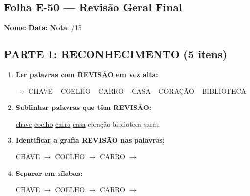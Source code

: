 \subsection{Folha E-50 --- Revisão Geral Final}
\begin{exercicio}



\noindent\textbf{Nome:} \underline{\hspace{3.2cm}} \quad \textbf{Data:} \underline{\hspace{1.6cm}} \quad \textbf{Nota:} \underline{\hspace{0.9cm}}/15


\subsection*{PARTE 1: RECONHECIMENTO (5 itens)}

\begin{enumerate}

  \item \textbf{Ler palavras com REVISÃO em voz alta:}
  \begin{center}
  $\rightarrow$ CHAVE ~ COELHO ~ CARRO ~ CASA ~ CORAÇÃO ~ BIBLIOTECA
  \end{center}

  \item \textbf{Sublinhar palavras que têm REVISÃO:}

\begin{center}
  \uline{chave} \quad \uline{coelho} \quad \uline{carro} \quad \uline{casa} \quad coração \quad biblioteca \quad sarau
\end{center}

  \item \textbf{Identificar a grafia REVISÃO nas palavras:}
  \begin{center}
  CHAVE $\rightarrow$ \underline{\hspace{1cm}} \quad COELHO $\rightarrow$ \underline{\hspace{1cm}} \quad CARRO $\rightarrow$ \underline{\hspace{1cm}}
  \end{center}

  \item \textbf{Separar em sílabas:}
  \begin{center}
  CHAVE $\rightarrow$ \underline{\hspace{1.2cm}} \quad COELHO $\rightarrow$ \underline{\hspace{1.2cm}} \quad CARRO $\rightarrow$ \underline{\hspace{1.2cm}}
  \end{center}


\end{enumerate}
\end{exercicio}
